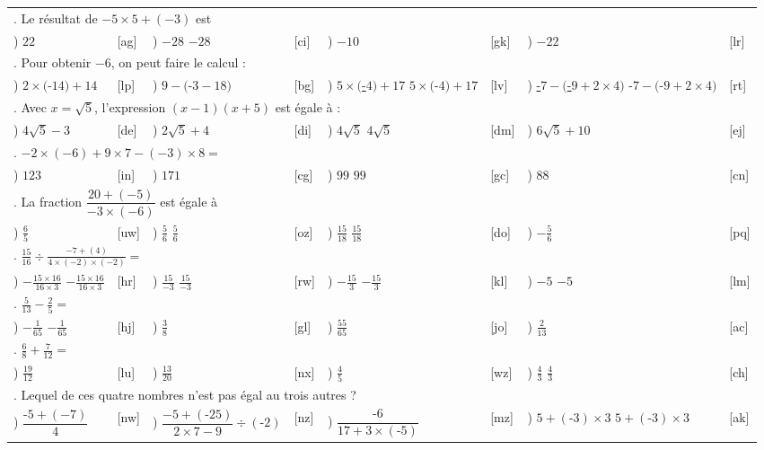 \documentclass[
	classe=$2^{de}$,
	headerTitle=Exercices\space chapitre\space 1
]{exercice}
\newcounter{QCMQuestionCounter}
\newcounter{QCMReponseCounter}
\newcommand{\QCMQuestion}[1]{
	\hline\multicolumn{8}{l}{\arabic{QCMQuestionCounter}. #1}\stepcounter{QCMQuestionCounter} \\
}
\newcommand{\QCMReponse}[8]{
	\setcounter{QCMReponseCounter}{1}         \alph{QCMReponseCounter}) #1 & [#2] & \stepcounter{QCMReponseCounter}           \alph{QCMReponseCounter}) #3 & [#4] & \stepcounter{QCMReponseCounter}           \alph{QCMReponseCounter}) #5 & [#6] & \stepcounter{QCMReponseCounter}           \alph{QCMReponseCounter}) #7 & [#8] \\
}
\newcommand{\QCMJuste}[1]{
\ifdefined\makeCorrection
\uline{{\color{red}#1}}
\else
#1
\fi
}
\begin{document}
\begin{tabular}{llllllll}
	\QCMQuestion{Le résultat de $-5 × 5 + (-3)$ est}
	\QCMReponse{$22$}{ag}{\QCMJuste{$-28$}}{ci}{$-10$}{gk}{$-22$}{lr}
	\QCMQuestion{Pour obtenir $-6$, on peut faire le calcul :}
	\QCMReponse{$2 × ($-$14) + 14$}{lp}{$9 - ($-$3 - 18)$}{bg}{\QCMJuste{$5 × ($-$4) + 17$}}{lv}{\QCMJuste{-$7 - ($-$9 + 2 × 4)$}}{rt}
	\QCMQuestion{Avec $x=\sqrt{5}$, l'expression $(x-1)(x+5)$ est égale à :}
	\QCMReponse{$4\sqrt{5} - 3$}{de}{$2\sqrt{5} + 4$}{di}{\QCMJuste{$4\sqrt{5}$}}{dm}{$6\sqrt{5} + 10$}{ej}
	\QCMQuestion{$-2 × (-6) + 9 × 7 - (-3) × 8 =$}
	\QCMReponse{$123$}{in}{$171$}{cg}{\QCMJuste{$99$}}{gc}{$88$}{cn}
	\QCMQuestion{La fraction $\dfrac{20 + (-5)}{-3 × (-6)}$ est égale à}
	\QCMReponse{$\frac{6}{5}$}{uw}{\QCMJuste{$\frac{5}{6}$}}{oz}{\QCMJuste{$\frac{15}{18}$}}{do}{$-\frac{5}{6}$}{pq}
	\QCMQuestion{$\frac{15}{16} ÷ \frac{-7 + (4)}{4 × (-2) × (-2)} =$}
	\QCMReponse{\QCMJuste{$-\frac{15 × 16}{16 × 3}$}}{hr}{\QCMJuste{$\frac{15}{-3}$}}{rw}{\QCMJuste{$-\frac{15}{3}$}}{kl}{\QCMJuste{$-5$}}{lm}
	\QCMQuestion{$\frac{5}{13}-\frac{2}{5} =$}
	\QCMReponse{\QCMJuste{$-\frac{1}{65}$}}{hj}{$\frac{3}{8}$}{gl}{$\frac{55}{65}$}{jo}{$\frac{2}{13}$}{ac}
	\QCMQuestion{$\frac{6}{8} + \frac{7}{12} =$}
	\QCMReponse{$\frac{19}{12}$}{lu}{$\frac{13}{20}$}{nx}{$\frac{4}{5}$}{wz}{\QCMJuste{$\frac{4}{3}$}}{ch}
	\QCMQuestion{Lequel de ces quatre nombres n'est pas égal au trois autres ?}
	\QCMReponse{$\dfrac{\text{-}5 + (-7)}{4}$}{nw}{$\dfrac{-5 + (\text{-}25)}{2 × 7 - 9} ÷ (\text{-}2)$}{nz}{$\dfrac{\text{-}6}{17 + 3 × (\text{-}5)}$}{mz}{\QCMJuste{$5 + (\text{-}3) × 3$}}{ak}
\end{tabular}
\end{document}

